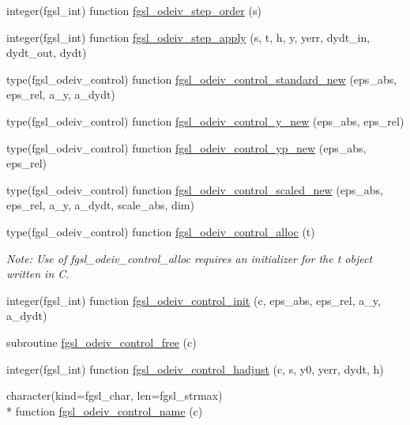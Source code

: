 \begin{DoxyCompactItemize}
\item 
integer(fgsl\-\_\-int) function \hyperlink{ode_8finc_ad473f673ac73701a32499c4f728c0ec0}{fgsl\-\_\-odeiv\-\_\-step\-\_\-order} (s)
\item 
integer(fgsl\-\_\-int) function \hyperlink{ode_8finc_a0447a8399777f24077e870ca2e3a2618}{fgsl\-\_\-odeiv\-\_\-step\-\_\-apply} (s, t, h, y, yerr, dydt\-\_\-in, dydt\-\_\-out, dydt)
\item 
type(fgsl\-\_\-odeiv\-\_\-control) function \hyperlink{ode_8finc_a8a7d90fb014f8aafeb3258a3edac66bf}{fgsl\-\_\-odeiv\-\_\-control\-\_\-standard\-\_\-new} (eps\-\_\-abs, eps\-\_\-rel, a\-\_\-y, a\-\_\-dydt)
\item 
type(fgsl\-\_\-odeiv\-\_\-control) function \hyperlink{ode_8finc_a1bf14333a561bcc24ac68aa26f69330d}{fgsl\-\_\-odeiv\-\_\-control\-\_\-y\-\_\-new} (eps\-\_\-abs, eps\-\_\-rel)
\item 
type(fgsl\-\_\-odeiv\-\_\-control) function \hyperlink{ode_8finc_a99432f111e5ae998c654c70d6c4196a7}{fgsl\-\_\-odeiv\-\_\-control\-\_\-yp\-\_\-new} (eps\-\_\-abs, eps\-\_\-rel)
\item 
type(fgsl\-\_\-odeiv\-\_\-control) function \hyperlink{ode_8finc_aeb584d23ceb54d815721a1a1a28171c5}{fgsl\-\_\-odeiv\-\_\-control\-\_\-scaled\-\_\-new} (eps\-\_\-abs, eps\-\_\-rel, a\-\_\-y, a\-\_\-dydt, scale\-\_\-abs, dim)
\item 
type(fgsl\-\_\-odeiv\-\_\-control) function \hyperlink{ode_8finc_aa135d17ea4a41614a6ac9789c11e220c}{fgsl\-\_\-odeiv\-\_\-control\-\_\-alloc} (t)
\begin{DoxyCompactList}\small\item\em Note\-: Use of fgsl\-\_\-odeiv\-\_\-control\-\_\-alloc requires an initializer for the t object written in C. \end{DoxyCompactList}\item 
integer(fgsl\-\_\-int) function \hyperlink{ode_8finc_a78a741026ae34107fa82e510868530b7}{fgsl\-\_\-odeiv\-\_\-control\-\_\-init} (c, eps\-\_\-abs, eps\-\_\-rel, a\-\_\-y, a\-\_\-dydt)
\item 
subroutine \hyperlink{ode_8finc_a8cc3184bf7c70b2ff108dea05763b452}{fgsl\-\_\-odeiv\-\_\-control\-\_\-free} (c)
\item 
integer(fgsl\-\_\-int) function \hyperlink{ode_8finc_a2792840e81747e88bf03c8ef0689699d}{fgsl\-\_\-odeiv\-\_\-control\-\_\-hadjust} (c, s, y0, yerr, dydt, h)
\item 
character(kind=fgsl\-\_\-char, len=fgsl\-\_\-strmax) \\*
function \hyperlink{ode_8finc_a1ff85c5d189557d6c94089dc1dd0bd99}{fgsl\-\_\-odeiv\-\_\-control\-\_\-name} (c)

\end{DoxyCompactItemize}
